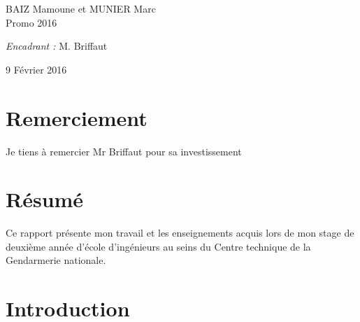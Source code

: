 {\begin{titlepage}
\begin{sffamily}
\begin{center}
    \begin{minipage}{0.4\textwidth}
      \begin{flushleft} \large
        BAIZ Mamoune et MUNIER Marc \\
        Promo 2016\\
      \end{flushleft}
    \end{minipage}
    \begin{minipage}{0.4\textwidth}
      \begin{flushright} \large
        \emph{Encadrant :} M. Briffaut\\
      \end{flushright}
    \end{minipage}

    \vfill

    {\large 9 Février 2016}

  \end{center}
  \end{sffamily}
\end{titlepage}
}
\newpage



\newpage
\section*{Remerciement}
Je tiens à remercier Mr Briffaut pour sa investissement 
\clearpage
\section*{Résumé}
Ce rapport présente mon travail et les enseignements acquis lors de mon stage de deuxième année d'école d'ingénieurs au seins du Centre technique de la Gendarmerie nationale. 

\newpage
\tableofcontents
\clearpage

%
% 
%
%
%
%


\section{Introduction}


